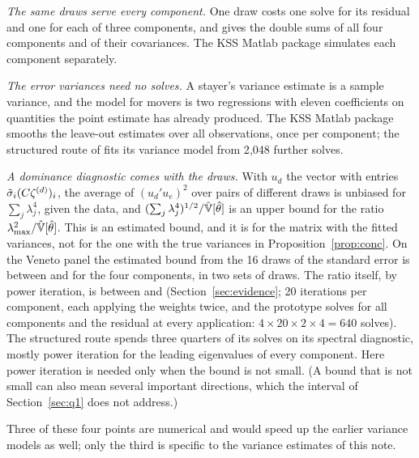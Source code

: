 \emph{The same draws serve every component.} One draw costs one solve for its residual and one for each of
three components, and gives the double sums of all four components and of their covariances. The KSS Matlab package simulates each component separately.

\emph{The error variances need no solves.} A stayer's variance estimate is a sample variance, and the model for
movers is two regressions with eleven coefficients on quantities the point estimate has already produced.
The KSS Matlab package smooths the leave-out estimates over all observations, once per component; the
structured route of \fevc{} fits its variance model from 2{,}048 further solves.

\emph{A dominance diagnostic comes with the draws.} With $u_d$ the vector with entries $\tilde\sigma_i(C\zeta^{(d)})_i$,
the average of $(u_d'u_e)^2$ over pairs of different draws is unbiased for $\sum_j\lambda_j^4$, given the data,
and $(\sum_j\lambda_j^4)^{1/2}/\hat{\mathbb{V}}[\hat\theta]$ is an upper bound for the ratio
$\lambda_{\max}^2/\hat{\mathbb{V}}[\hat\theta]$. This is an estimated bound, and it is for the matrix with the fitted
variances, not for the one with the true variances in Proposition~\ref{prop:conc}. On the Veneto panel the estimated bound from the 16 draws of the standard error is between
 and  for the four components, in two sets of draws. The ratio itself, by power
iteration, is between  and  (Section~\ref{sec:evidence}; 20 iterations per
component, each applying the weights twice, and the prototype solves for all components and the residual at
every application: $4\times20\times2\times4=640$ solves). The structured route spends three quarters of its solves on its spectral diagnostic, mostly power iteration
for the leading eigenvalues of every component. Here power iteration is needed only when the bound is not
small. (A bound that is not small can also mean several important directions, which the interval of
Section~\ref{sec:q1} does not address.)

Three of these four points are numerical and would speed up the earlier variance models as well; only the
third is specific to the variance estimates of this note.


